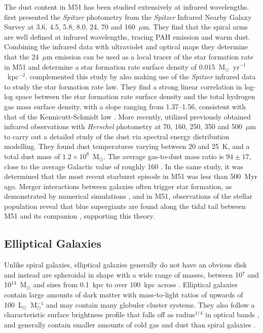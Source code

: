 The dust content in M51 has been studied extensively at infrared wavelengths.  \citet{2005ApJ...633..871C} first presented the \emph{Spitzer} photometry from the \emph{Spitzer} Infrared Nearby Galaxy Survey \citep[SINGS; ][]{2003PASP..115..928K} at 3.6, 4.5, 5.8, 8.0, 24, 70 and 160~$\mu$m.  They find that the spiral arms are well defined at infrared wavelengths, tracing PAH emission and warm dust.  Combining the infrared data with ultraviolet and optical maps they determine that the 24~$\mu$m emission can be used as a local tracer of the star formation rate in M51 and determine a star formation rate surface density of 0.015~M$_{\odot}$~yr$^{-1}$~kpc$^{-2}$.  \citet{2007ApJ...671..333K} complemented this study by also making use of the \emph{Spitzer} infrared data to study the star formation rate law.  They find a strong linear correlation in log-log space between the star formation rate surface density and the total hydrogen gas mass surface density, with a slope ranging from 1.37--1.56, consistent with that of the Kennicutt-Schmidt law \citep[which has a slope of $1.4 \pm 0.15$; ][]{1998ApJ...498..541K}.  More recently, \citet{2012ApJ...755..165M} utilized previously obtained infrared observations with \emph{Herschel} photometry at 70, 160, 250, 350 and 500~$\mu$m to carry out a detailed study of the dust via spectral energy distribution modelling.  They found dust temperatures varying between 20 and 25~K, and a total dust mass of $1.2 \times 10^{8}$~M$_{\odot}$.  The average gas-to-dust mass ratio is $94 \pm 17$, close to the average Galactic value of roughly 160 \citep{2004ApJS..152..211Z}.  In the same study, it was determined that the most recent starburst episode in M51 was less than 500~Myr ago.  Merger interactions between galaxies often trigger star formation, as demonstrated by numerical simulations \citep[e.g.][]{1996ApJ...464..641M}, and in M51, observations of the stellar population reveal that blue supergiants are found along the tidal tail between M51 and its companion \citep{2009AstL...35..599T}, supporting this theory.

\subsection{Elliptical Galaxies}\label{ellip}
Unlike spiral galaxies, elliptical galaxies generally do not have an obvious disk and instead are spheroidal in shape with a wide range of masses, between 10$^{7}$ and 10$^{13}$~M$_{\odot}$ and sizes from 0.1~kpc to over 100~kpc across \citep{carrol_ostlie}.  Elliptical galaxies contain large amounts of dark matter with mass-to-light ratios of upwards of 100~L$_{\odot}$~M$^{-1}_{\odot}$ \citep{carrol_ostlie} and may contain many globuler cluster systems.  They also follow a characteristic surface brightness profile that falls off as radius$^{1/4}$ in optical bands \citep{1948AnAp...11..247D}, and generally contain smaller amounts of cold gas and dust than spiral galaxies \citep[e.g.][]{2004A&A...416...41X, 2010ApJ...725..100W,2011MNRAS.414..940Y,2012ApJ...748..123S}.

